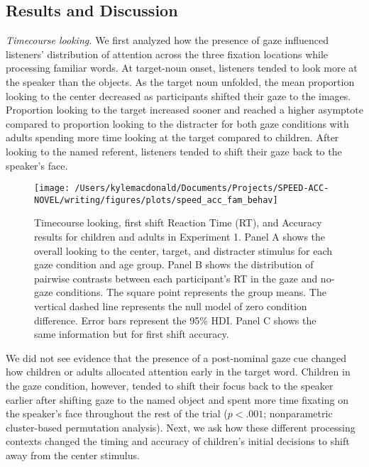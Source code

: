 \documentclass[10pt, letterpaper]{article}
\newenvironment{CodeChunk}{}{}
\begin{document}
\hypertarget{results-and-discussion}{%
\subsection{Results and Discussion}\label{results-and-discussion}}

\emph{Timecourse looking.} We first analyzed how the presence of gaze
influenced listeners' distribution of attention across the three
fixation locations while processing familiar words. At target-noun
onset, listeners tended to look more at the speaker than the objects. As
the target noun unfolded, the mean proportion looking to the center
decreased as participants shifted their gaze to the images. Proportion
looking to the target increased sooner and reached a higher asymptote
compared to proportion looking to the distracter for both gaze
conditions with adults spending more time looking at the target compared
to children. After looking to the named referent, listeners tended to
shift their gaze back to the speaker's face.

\begin{CodeChunk}
\begin{figure*}[t]

{\centering \texttt{[image: /Users/kylemacdonald/Documents/Projects/SPEED-ACC-NOVEL/writing/figures/plots/speed\_acc\_fam\_behav]} 

}

\caption[Timecourse looking, first shift Reaction Time (RT), and Accuracy results for children and adults in Experiment 1]{Timecourse looking, first shift Reaction Time (RT), and Accuracy results for children and adults in Experiment 1. Panel A shows the overall looking to the center, target, and distracter stimulus for each gaze condition and age group. Panel B shows the distribution of pairwise contrasts between each participant's RT in the gaze and no-gaze conditions. The square point represents the group means. The vertical dashed line represents the null model of zero condition difference. Error bars represent the 95\% HDI. Panel C shows the same information but for first shift accuracy.}\label{fig:speed-acc-gaze-results}
\end{figure*}
\end{CodeChunk}

We did not see evidence that the presence of a post-nominal gaze cue
changed how children or adults allocated attention early in the target
word. Children in the gaze condition, however, tended to shift their
focus back to the speaker earlier after shifting gaze to the named
object and spent more time fixating on the speaker's face throughout the
rest of the trial (\(p < .001\); nonparametric cluster-based permutation
analysis). Next, we ask how these different processing contexts changed
the timing and accuracy of children's initial decisions to shift away
from the center stimulus.
\end{document}

